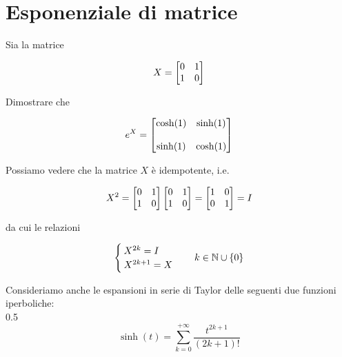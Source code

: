 %

\section{Esponenziale di matrice}\label{es3-3}

\begin{tcolorbox}
	Sia la matrice
	
	\begin{equation}
		X = \bmqty{ %
					0 & 1 \\
					1 & 0 %
					}
	\end{equation}
	
	Dimostrare che
	
	\begin{equation}
		e^{X} = \bmqty{ %
						\cosh(1) & \sinh(1) \\\\
						\sinh(1) & \cosh(1) %
						}
	\end{equation}
\end{tcolorbox}

Possiamo vedere che la matrice $ X $ è idempotente, i.e.

\begin{equation}
	X^{2} = \bmqty{ %
					0 & 1 \\
					1 & 0 %
					} %
			\bmqty{ %
					0 & 1 \\
					1 & 0 %
					} %
	= \bmqty{ %
				1 & 0 \\
				0 & 1 %
				} %
	= I
\end{equation}

da cui le relazioni

\begin{equation}
	\begin{cases}
		X^{2k} = I \\
		X^{2k+1} = X
	\end{cases}
	\quad k \in \mathbb{N} \cup \{0\}
\end{equation}

Consideriamo anche le espansioni in serie di Taylor delle seguenti due funzioni iperboliche:\\

	{0.5}{%
			\begin{equation}
				\sinh(t) = \sum_{k=0}^{+\infty} \dfrac{t^{2k+1}}{(2k+1)!}
			\end{equation}
			}

